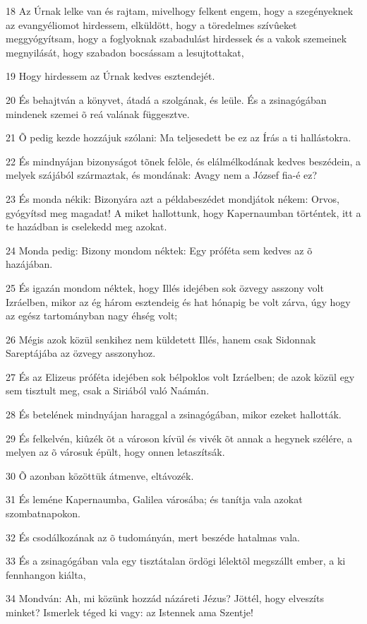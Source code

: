 \par 18 Az Úrnak lelke van és rajtam, mivelhogy felkent engem, hogy a szegényeknek az evangyéliomot hirdessem, elküldött, hogy a töredelmes szívûeket meggyógyítsam, hogy a foglyoknak szabadulást hirdessek és a vakok szemeinek megnyilását, hogy szabadon bocsássam a lesujtottakat,
\par 19 Hogy hirdessem az Úrnak kedves esztendejét.
\par 20 És behajtván a könyvet, átadá a szolgának, és leüle. És a zsinagógában mindenek szemei õ reá valának függesztve.
\par 21 Õ pedig kezde hozzájuk szólani: Ma teljesedett be ez az Írás a ti hallástokra.
\par 22 És mindnyájan bizonyságot tõnek felõle, és elálmélkodának kedves beszédein, a melyek szájából származtak, és mondának: Avagy nem a József fia-é ez?
\par 23 És monda nékik: Bizonyára azt a példabeszédet mondjátok nékem: Orvos, gyógyítsd meg magadat! A miket hallottunk, hogy Kapernaumban történtek, itt a te  hazádban is cselekedd meg azokat.
\par 24 Monda pedig: Bizony mondom néktek: Egy próféta sem kedves az õ hazájában.
\par 25 És igazán mondom néktek, hogy Illés idejében sok özvegy asszony volt Izráelben, mikor az ég három esztendeig és hat hónapig be volt zárva, úgy hogy az egész tartományban nagy éhség volt;
\par 26 Mégis azok közül senkihez nem küldetett Illés, hanem csak Sidonnak Sareptájába az özvegy asszonyhoz.
\par 27 És az Elizeus próféta idejében sok bélpoklos volt Izráelben; de azok közül egy sem tisztult meg, csak a Siriából való Naámán.
\par 28 És betelének mindnyájan haraggal a zsinagógában, mikor ezeket hallották.
\par 29 És felkelvén, kiûzék õt a városon kívül és vivék õt annak a hegynek szélére, a melyen az õ városuk épült, hogy onnen letaszítsák.
\par 30 Õ azonban közöttük átmenve, eltávozék.
\par 31 És leméne Kapernaumba, Galilea városába; és tanítja vala azokat szombatnapokon.
\par 32 És csodálkozának az õ tudományán, mert beszéde hatalmas vala.
\par 33 És a zsinagógában vala egy tisztátalan ördögi lélektõl megszállt ember, a ki fennhangon kiálta,
\par 34 Mondván: Ah, mi közünk hozzád názáreti Jézus? Jöttél, hogy elveszíts minket? Ismerlek téged ki vagy: az Istennek ama Szentje!
